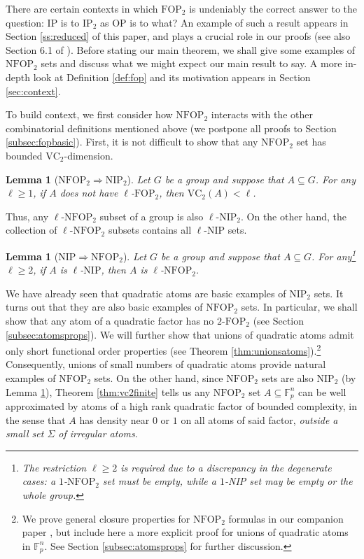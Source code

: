 \documentclass[12pt,oneside,british,a4wide]{amsart}
\newtheorem{lemma}[theorem]{Lemma}
\numberwithin{equation}{section}
\theoremstyle{definition}
\def\F{\mathbb{F}}
\def\FOP{\mathrm{FOP}}
\def\NFOP{\mathrm{NFOP}}
\def\IP{\mathrm{IP}}
\def\NIP{\mathrm{NIP}}
\def\VC{\mathrm{VC}}
\begin{document}
There are certain contexts in which $\FOP_2$ is undeniably the correct answer to the question: IP is to $\IP_2$ as OP is to what?  An example of such a result appears in Section \ref{ss:reduced} of this paper, and plays a crucial role in our proofs (see also Section 6.1 of \cite{Terry.2021b}).   Before stating our main theorem, we shall give some examples of $\NFOP_2$ sets and discuss what we might expect our main result to say.  A more in-depth look at Definition \ref{def:fop} and its motivation appears in Section \ref{sec:context}.

To build context,  we first consider how $\NFOP_2$ interacts with the other combinatorial definitions mentioned above (we postpone all proofs to Section \ref{subsec:fopbasic}). First, it is not difficult to show that any $\NFOP_2$ set has bounded $\VC_2$-dimension. 

\begin{lemma}[$\NFOP_2\Rightarrow \NIP_2$]\label{lem:nip2fop}
Let $G$ be a group and suppose that $A\subseteq G$. For any $\ell\geq 1$, if $A$ does not have $\ell$-$\FOP_2$, then $\VC_2(A)< \ell$.
\end{lemma}

Thus, any $\ell$-$\NFOP_2$ subset of a group is also $\ell$-$\NIP_2$.  On the other hand, the collection of $\ell$-$\NFOP_2$ subsets contains all $\ell$-$\NIP$ sets.

\begin{lemma}[$\NIP\Rightarrow \NFOP_2$]\label{lem:vcfop}
Let $G$ be a group and suppose that $A\subseteq G$. For any\footnote{The restriction $\ell \geq 2$ is required due to a discrepancy in the degenerate cases: a $1$-$\NFOP_2$ set must be empty, while a $1$-NIP set may be empty or the whole group.} $\ell\geq 2$, if $A$ is $\ell$-$\NIP$, then $A$ is $\ell$-$\NFOP_2$. 
\end{lemma}

We have already seen that quadratic atoms are basic examples of $\NIP_2$ sets. It turns out that they are also basic examples of $\NFOP_2$ sets. In particular, we shall show that any atom of a quadratic factor has no $2$-$\FOP_2$ (see Section \ref{subsec:atomsprops}). We will further show that unions of quadratic atoms admit only short functional order properties (see Theorem \ref{thm:unionsatoms}).\footnote{We prove general closure properties for $\NFOP_2$ formulas in our companion paper \cite{Terry.2021b}, but include here a more explicit proof for unions of quadratic atoms in $\F_p^n$. See Section \ref{subsec:atomsprops} for further discussion.}  Consequently, unions of small numbers of quadratic atoms provide natural examples of $\NFOP_2$ sets. On the other hand, since $\NFOP_2$ sets are also $\NIP_2$ (by Lemma \ref{lem:nip2fop}),  Theorem \ref{thm:vc2finite} tells us any $\NFOP_2$ set $A\subseteq\F_p^n$ can be well approximated by atoms of a high rank quadratic factor of bounded complexity, in the sense that $A$ has density near $0$ or $1$ on all atoms of said factor, \emph{outside a small set $\Sigma$ of irregular atoms}.  
\end{document}
